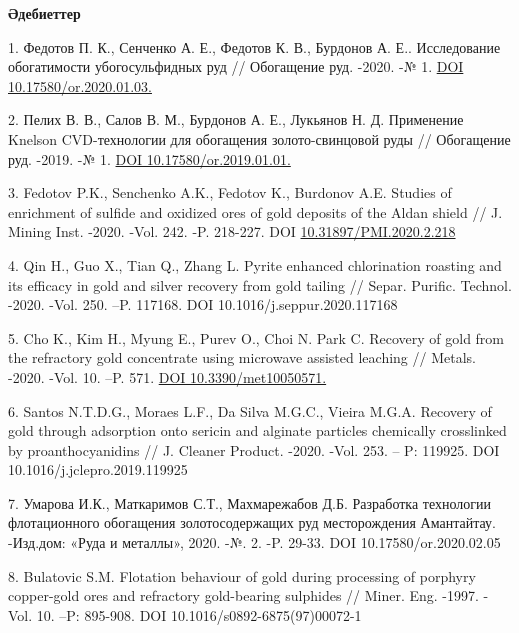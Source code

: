 \begin{center}
	{\bfseries Әдебиеттер}
	\end{center}
	
	\begin{references}

1. Федотов П. К., Сенченко А. Е., Федотов К. В., Бурдонов А. Е..
Исследование обогатимости убогосульфидных руд // Обогащение руд. -2020.
-№ 1. \href{https://doi.org/10.17580/or.2020.01.03}{DOI
10.17580/or.2020.01.03.}

2. Пелих В. В., Салов В. М., Бурдонов А. Е., Лукьянов Н. Д. Применение
Knelson CVD-технологии для обогащения золото-свинцовой руды //
Обогащение руд. -2019. -№ 1.
\href{https://doi.org/10.17580/or.2019.01.01}{DOI
10.17580/or.2019.01.01.}

3. Fedotov P.K., Senchenko A.K., Fedotov K., Burdonov A.E. Studies of
enrichment of sulfide and oxidized ores of gold deposits of the Aldan
shield // J. Mining Inst. -2020. -Vol. 242. -P. 218-227. DOI
\href{https://doi.org/10.31897/PMI.2020.2.218}{10.31897/PMI.2020.2.218}

4. Qin H., Guo X., Tian Q., Zhang L. Pyrite enhanced chlorination
roasting and its efficacy in gold and silver recovery from gold tailing
// Separ. Purific. Technol. -2020. -Vol. 250. --P. 117168. DOI
10.1016/j.seppur.2020.117168

5. Cho K., Kim H., Myung E., Purev O., Choi N. Park C. Recovery of gold
from the refractory gold concentrate using microwave assisted leaching
// Metals. -2020. -Vol. 10. --P. 571.
\href{https://doi.org/10.3390/met10050571}{DOI 10.3390/met10050571.}

6. Santos N.T.D.G., Moraes L.F., Da Silva M.G.C., Vieira M.G.A. Recovery
of gold through adsorption onto sericin and alginate particles
chemically crosslinked by proanthocyanidins // J. Cleaner Product.
-2020. -Vol. 253. -- P: 119925. DOI 10.1016/j.jclepro.2019.119925

7. Умарова И.К., Маткаримов С.Т., Махмарежабов Д.Б. Разработка
технологии флотационного обогащения золотосодержащих руд месторождения
Амантайтау. -Изд.дом: «Руда и металлы», 2020. -№. 2. -P. 29-33. DOI
10.17580/or.2020.02.05

8. Bulatovic S.M. Flotation behaviour of gold during processing of
porphyry copper-gold ores and refractory gold-bearing sulphides //
Miner. Eng. -1997. -Vol. 10. --P: 895-908. DOI
10.1016/s0892-6875(97)00072-1

\end{references}

